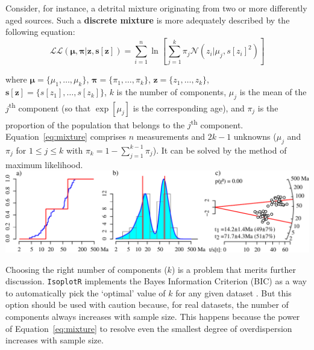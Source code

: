 \begin{refsection}
Consider, for instance, a detrital mixture originating from two or
more differently aged sources. Such a \textbf{discrete mixture} is
more adequately described by the following equation:
\begin{equation}
  \mathcal{LL}({\boldsymbol\mu},{\boldsymbol\pi}|\mathbf{z},\mathbf{s[z]}) =
  \sum_{i=1}^n\ln\!\left[\sum_{j=1}^k \pi_j \mathcal{N}\left( z_i | \mu_j, s[z_i]^2\right)\right]
  \label{eq:mixture}
\end{equation}

\noindent where ${\boldsymbol\mu}=\{\mu_1,\ldots,\mu_k\}$,
${\boldsymbol\pi}=\{\pi_1,\ldots,\pi_k\}$,
$\mathbf{z}=\{z_1,\ldots,z_k\}$,
$\mathbf{s[z]}=\{s[z_1],\ldots,s[z_k]\}$, $k$ is the number of
components, $\mu_j$ is the mean of the $j$\textsuperscript{th}
component (so that $\exp[\mu_j]$ is the corresponding age), and
$\pi_j$ is the proportion of the population that belongs to the
$j$\textsuperscript{th} component. Equation~\ref{eq:mixture} comprises
$n$ measurements and $2k-1$ unknowns ($\mu_j$ and $\pi_j$ for $1 \leq
j \leq k$ with $\pi_k=1-\sum_{j=1}^{k-1}\pi_j$). It can be solved by
the method of maximum likelihood.\\

\noindent\includegraphics[width=\textwidth]{../figures/discretemixtures.pdf}
\begingroup {}
\label{fig:discretemixtures}
\endgroup

Choosing the right number of components ($k$) is a problem that merits
further discussion. \texttt{IsoplotR} implements the Bayes Information
Criterion (BIC) as a way to automatically pick the `optimal' value of
$k$ for any given dataset \citep[Section~5.6 of][]{galbraith2005}. But
this option should be used with caution because, for real datasets,
the number of components always increases with sample size. This
happens because the power of Equation~\ref{eq:mixture} to resolve even
the smallest degree of overdispersion increases with sample size.\\


\end{refsection}
